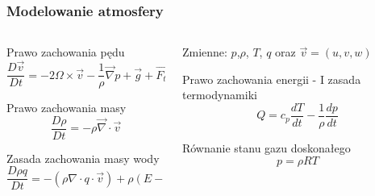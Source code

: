\documentclass{beamer}
\begin{document}
\begin{frame}
	\frametitle{Modelowanie atmosfery}
	\begin{columns}
\begin{column}{0.5\textwidth}
		\begin{block}{Prawo zachowania pędu}
			\[
				\frac{D\vec{v}}{Dt} = -2 \Omega \times \vec{v} - \frac{1}{\rho}
			\vec{\nabla} p + \vec{g} + \vec{F_{tar}}
			\]
		
		\end{block}
		
		\begin{block}{Prawo zachowania masy}
		\[
			\frac{D\rho}{Dt} = -\rho\vec{\nabla} \cdot \vec{v}
		\]
		\end{block}
		\begin{block}{Zasada zachowania masy wody}
			\[
				\frac{D\rho q}{Dt} = -(\rho\nabla \cdot q \cdot \vec{v}) + \rho(E-C)
			\]

	\end{block}
	\end{column}
	\begin{column}{0.5\textwidth}
	Zmienne: $p$,$\rho$, $T$, $q$ oraz $\vec{v} =(u,v,w)$
		\begin{block}{Prawo zachowania energii - I zasada termodynamiki}
			\[Q = c_p\frac{dT}{dt} - \frac{1}{\rho}\frac{dp}{dt}
			\]
		\end{block}
		
		\begin{block}{Równanie stanu gazu doskonałego}		
			\[p=\rho RT
			\]
		\end{block}
	\end{column}
	\end{columns}
\end{frame}
\end{document}

